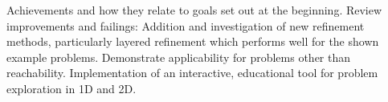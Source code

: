 Achievements and how they relate to goals set out at the beginning.
Review improvements and failings:
Addition and investigation of new refinement methods, particularly layered refinement which performs well for the shown example problems.
Demonstrate applicability for problems other than reachability.
Implementation of an interactive, educational tool for problem exploration in 1D and 2D.

